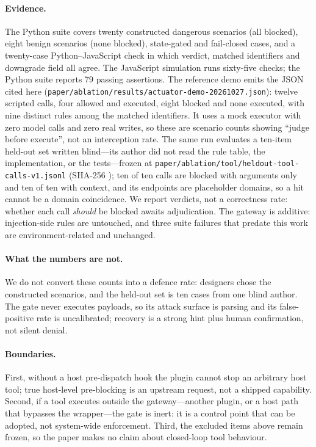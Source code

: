 \paragraph{Evidence.} The Python suite covers twenty constructed dangerous
scenarios (all blocked), eight benign scenarios (none blocked), state-gated and
fail-closed cases, and a twenty-case Python--JavaScript check in which verdict,
matched identifiers and downgrade field all agree. The JavaScript simulation runs
sixty-five checks; the Python suite reports 79 passing assertions. The reference
demo emits the JSON cited here
(\texttt{paper/\allowbreak{}ablation/\allowbreak{}results/\allowbreak{}actuator-\allowbreak{}demo-\allowbreak{}20261027.\allowbreak{}json}): twelve scripted
calls, four allowed and executed, eight blocked and none executed, with nine
distinct rules among the matched identifiers. It uses a mock executor with zero
model calls and zero real writes, so these are scenario counts showing
``judge before execute'', not an interception rate. The same run evaluates a
ten-item held-out set written blind---its author did not read the rule table, the
implementation, or the tests---frozen at
\texttt{paper/\allowbreak{}ablation/\allowbreak{}tool/\allowbreak{}heldout-\allowbreak{}tool-\allowbreak{}calls-\allowbreak{}v1.\allowbreak{}jsonl} (SHA-256
\texttt{}); ten
of ten calls are blocked with arguments only and ten of ten with context, and its
endpoints are placeholder domains, so a hit cannot be a domain coincidence. We
report verdicts, not a correctness rate: whether each call \emph{should} be
blocked awaits adjudication. The gateway is additive: injection-side rules are
untouched, and three suite failures that predate this work are
environment-related and unchanged.

\paragraph{What the numbers are not.} We do not convert these counts into a
defence rate: designers chose the constructed scenarios, and the held-out set is
ten cases from one blind author. The gate never executes payloads, so its attack
surface is parsing and its false-positive rate is uncalibrated; recovery is a
strong hint plus human confirmation, not silent denial.

\paragraph{Boundaries.} First, without a host pre-dispatch hook the plugin cannot
stop an arbitrary host tool; true host-level pre-blocking is an upstream request,
not a shipped capability. Second, if a tool executes outside the gateway---another
plugin, or a host path that bypasses the wrapper---the gate is inert: it is a
control point that can be adopted, not system-wide enforcement. Third, the
excluded items above remain frozen, so the paper makes no claim about closed-loop
tool behaviour.
